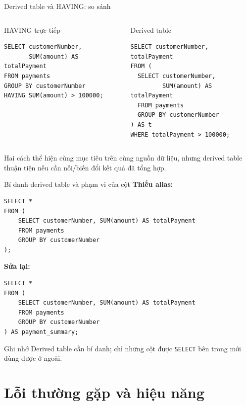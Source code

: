 \documentclass[aspectratio=169,10pt]{beamer}
\newcommand{\code}[1]{\texttt{#1}}
\begin{document}
\begin{frame}[fragile]{Derived table và HAVING: so sánh}
\begin{columns}[T,onlytextwidth]
\begin{block}{HAVING trực tiếp}
\begin{lstlisting}
SELECT customerNumber,
       SUM(amount) AS totalPayment
FROM payments
GROUP BY customerNumber
HAVING SUM(amount) > 100000;
\end{lstlisting}
\end{block}
\begin{block}{Derived table}
\begin{lstlisting}
SELECT customerNumber, totalPayment
FROM (
  SELECT customerNumber,
         SUM(amount) AS totalPayment
  FROM payments
  GROUP BY customerNumber
) AS t
WHERE totalPayment > 100000;
\end{lstlisting}
\end{block}
\end{columns}
\vspace{.2em}\footnotesize Hai cách thể hiện cùng mục tiêu trên cùng nguồn dữ liệu, nhưng derived table thuận tiện nếu cần nối/biến đổi kết quả đã tổng hợp.
\end{frame}

\begin{frame}[fragile]{Bí danh derived table và phạm vi của cột}
\textbf{Thiếu alias:}\begin{lstlisting}
SELECT *
FROM (
    SELECT customerNumber, SUM(amount) AS totalPayment
    FROM payments
    GROUP BY customerNumber
);
\end{lstlisting}
\textbf{Sửa lại:}\begin{lstlisting}
SELECT *
FROM (
    SELECT customerNumber, SUM(amount) AS totalPayment
    FROM payments
    GROUP BY customerNumber
) AS payment_summary;
\end{lstlisting}
\begin{block}{Ghi nhớ}
\small Derived table cần bí danh; chỉ những cột được \code{SELECT} bên trong mới dùng được ở ngoài.
\end{block}
\end{frame}

\section{Lỗi thường gặp và hiệu năng}
\end{document}
